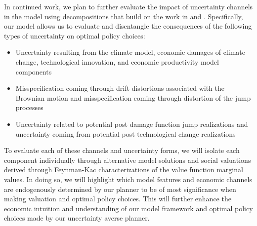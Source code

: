 \documentclass[12pt]{article}
\begin{document}
In continued work, we plan to further evaluate the impact of uncertainty channels in the model using decompositions that build on the work in \cite{BarnettBrockHansen:2020} and \cite{BarnettBrockHansenZhang:2023}. Specifically, our model allows us to evaluate and disentangle the consequences of the following types of uncertainty on optimal policy choices:
\begin{itemize}
\item Uncertainty resulting from the climate model, economic damages of climate change, technological innovation, and economic productivity model components
\item Misspecification coming through drift distortions associated with the Brownian motion and misspecification coming through distortion of the jump processes
\item Uncertainty related to potential post damage function jump realizations and uncertainty coming from potential post technological change realizations
\end{itemize}

To evaluate each of these channels and uncertainty forms, we will isolate each component individually through alternative model solutions and social valuations derived through Feynman-Kac characterizations of the value function marginal values. In doing so, we will highlight which model features and economic channels are endogenously determined by our planner to be of most significance when making valuation and optimal policy choices. This will further enhance the economic intuition and understanding of our model framework and optimal policy choices made by our uncertainty averse planner.





\end{document}

